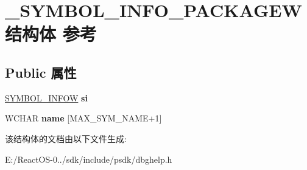 \hypertarget{struct___s_y_m_b_o_l___i_n_f_o___p_a_c_k_a_g_e_w}{}\section{\+\_\+\+S\+Y\+M\+B\+O\+L\+\_\+\+I\+N\+F\+O\+\_\+\+P\+A\+C\+K\+A\+G\+E\+W结构体 参考}
\label{struct___s_y_m_b_o_l___i_n_f_o___p_a_c_k_a_g_e_w}
\subsection*{Public 属性}
\begin{DoxyCompactItemize}
\item 
\mbox{\label{struct___s_y_m_b_o_l___i_n_f_o___p_a_c_k_a_g_e_w_aed0772cfa600110efe596e5e0e241116}} 
\hyperlink{struct___s_y_m_b_o_l___i_n_f_o_w}{S\+Y\+M\+B\+O\+L\+\_\+\+I\+N\+F\+OW} {\bfseries si}
\item 
\mbox{\label{struct___s_y_m_b_o_l___i_n_f_o___p_a_c_k_a_g_e_w_a794a0789ace180c3b583c1ce8b127da9}} 
W\+C\+H\+AR {\bfseries name} \mbox{[}M\+A\+X\+\_\+\+S\+Y\+M\+\_\+\+N\+A\+ME+1\mbox{]}
\end{DoxyCompactItemize}


该结构体的文档由以下文件生成\+:\begin{DoxyCompactItemize}
\item 
E\+:/\+React\+O\+S-\/0../sdk/include/psdk/dbghelp.\+h\end{DoxyCompactItemize}
